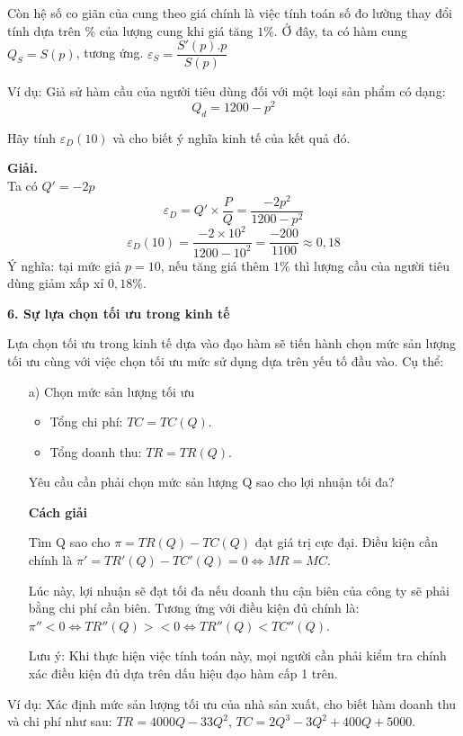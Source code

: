 \documentclass[12pt,a4paper]{report}
\begin{document}
Còn hệ số co giãn của cung theo giá chính là việc tính toán số đo lường thay đổi tính dựa trên $\%$ của lượng cung khi giá tăng $1\%$. Ở đây, ta có hàm cung $Q_S = S(p)$, tương ứng. $\varepsilon_S = \dfrac{S'(p).p}{S(p)}$

Ví dụ: Giả sử hàm cầu của người tiêu dùng đối với một loại sản phẩm có dạng:
\[
    Q_d = 1200 - p^2    
\]

Hãy tính $\varepsilon_D (10)$ và cho biết ý nghĩa kinh tế của kết quả đó.

\textbf{Giải.}\\
Ta có $Q' = -2p$
\[
    \varepsilon_D = Q' \times \frac{P}{Q} = \frac{-2p^2}{1200 - p^2} 
\]
\[
    \varepsilon_D (10) = \frac{-2\times 10^2}{1200 - 10^2}= \frac{-200}{1100} \approx 0,18
\]
Ý nghĩa: tại mức giả $p=10$, nếu tăng giá thêm $1\%$ thì lượng cầu của người tiêu dùng giảm xấp xỉ $0,18\%$.

\textbf{6. Sự lựa chọn tối ưu trong kinh tế}

Lựa chọn tối ưu trong kinh tế dựa vào đạo hàm sẽ tiến hành chọn mức sản lượng tối ưu cùng với việc chọn tối ưu mức sử dụng dựa trên yếu tố đầu vào. Cụ thể:

\begin{itemize}
    \item[a)] Chọn mức sản lượng tối ưu
        \begin{itemize}
            \item Tổng chi phí: $TC = TC(Q)$.
            \item Tổng doanh thu: $TR = TR(Q)$.
        \end{itemize}    
        Yêu cầu cần phải chọn mức sản lượng Q sao cho lợi nhuận tối đa?
        
        \textbf{Cách giải}

        Tìm Q sao cho $\pi = TR(Q) - TC(Q)$ đạt giá trị cực đại. Điều kiện cần chính là $\pi' = TR'(Q) - TC'(Q) = 0 \Leftrightarrow MR = MC$.

Lúc này, lợi nhuận sẽ đạt tối đa nếu doanh thu cận biên của công ty sẽ phải bằng chi phí cần biên. Tương ứng với điều kiện đủ chính là: $\pi''<0 \Leftrightarrow TR''(Q) > < 0 \Leftrightarrow TR''(Q) < TC''(Q)$.

Lưu ý: Khi thực hiện việc tính toán này, mọi người cần phải kiểm tra chính xác điều kiện đủ dựa trên dấu hiệu đạo hàm cấp 1 trên.
    \end{itemize}
Ví dụ: Xác định mức sản lượng tối ưu của nhà sản xuất, cho biết hàm doanh thu và chi phí như sau: $TR = 4000Q  -33Q^2$, $TC = 2Q^3 - 3Q^2 + 400Q + 5000$.
\end{document}
